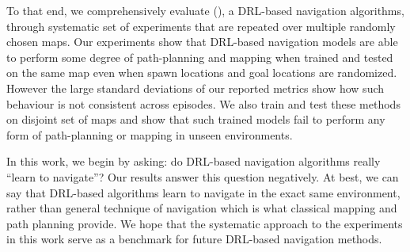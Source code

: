 To that end, we comprehensively evaluate  \NavAiiiCDiDiiL{} (\cite{MiPaViICLR2017}), a DRL-based navigation algorithms, through systematic set of experiments that
are repeated over multiple randomly chosen maps.
Our experiments show that DRL-based navigation models are able to perform some degree of path-planning and mapping when trained and tested on the same map even when spawn locations and goal locations are randomized. 
However the large standard deviations of our reported metrics show how such behaviour is not consistent across episodes. 
We also train and test these methods on disjoint set of maps and show that such trained models fail to perform any form of path-planning or mapping in unseen environments.

In this work, we begin by asking: do DRL-based navigation algorithms really ``learn to navigate''?
Our results answer this question negatively. At best, we can say that DRL-based algorithms learn to navigate in the exact same environment, rather than general technique of navigation which is what classical mapping and path planning provide.
We hope that the systematic approach to the experiments in this work serve as a benchmark for future DRL-based navigation methods.

